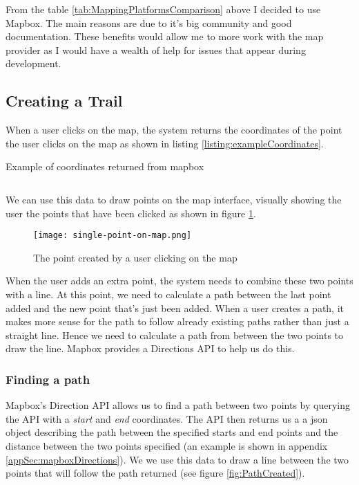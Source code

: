 From the table \ref{tab:MappingPlatformsComparison} above I decided to use Mapbox. The main reasons are due to it's big community and good documentation. These benefits would allow me to more work with the map provider as I would have a wealth of help for issues that appear during development.

\subsection{Creating a Trail}
When a user clicks on the map, the system returns the coordinates of the point the user clicks on the map as shown in listing \ref{listing:exampleCoordinates}.

\begin{listing}[ht]
\caption{Example of coordinates returned from mapbox}
\inputminted[frame=lines,framesep=2mm,baselinestretch=1.2,fontsize=\footnotesize]{json}{listings/example-coordinates.json}
\label{listing:exampleCoordinates}
\end{listing}

We can use this data to draw points on the map interface, visually showing the user the points that have been clicked as shown in figure \ref{fig:SinglePointCreated}. 
\begin{figure}[ht]
    \centering
    \texttt{[image: single-point-on-map.png]}
    \caption{The point created by a user clicking on the map}
    \label{fig:SinglePointCreated}
\end{figure}
When the user adds an extra point, the system needs to combine these two points with a line. At this point, we need to calculate a path between the last point added and the new point that's just been added. When a user creates a path, it makes more sense for the path to follow already existing paths rather than just a straight line. Hence we need to calculate a path from between the two points to draw the line. Mapbox provides a Directions API to help us do this.


\subsubsection{Finding a path}
Mapbox's Direction API allows us to find a path between two points by querying the API with a \textit{start} and \textit{end} coordinates.  The API then returns us a a json object describing the path between the specified starts and end points and the distance between the two points specified (an example is shown in appendix \ref{appSec:mapboxDirections}). We we use this data to draw a line between the two points that will follow the path returned (see figure \ref{fig:PathCreated}).

